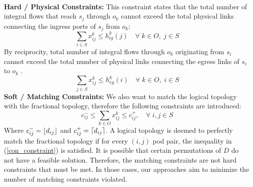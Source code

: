 \documentclass[sigconf]{acmart}
\theoremstyle{definition}
\begin{document}
\textbf{\\Hard / Physical Constraints: } This constraint states that the total number of integral flows that reach $s_j$ through $o_k$ cannot exceed the total physical links connecting the ingress ports of $s_j$ from $o_k$:
\begin{equation}\label{phy_constraint1}
    \sum_{i \in S} x_{ij}^k \leq h_{ig}^k(j) \quad \forall \; k \in O, \; j \in S
\end{equation}
By reciprocity, total number of integral flows through $o_k$ originating from $s_i$ cannot exceed the total number of physical links connecting the egress links of $s_i$ to $o_k$ .
\begin{equation}\label{phy_constraint2}
    \sum_{j \in S} x_{ij}^k \leq h_{eg}^k(i) \quad \forall \; k \in O, \; i \in S
\end{equation}
\textbf{Soft / Matching Constraints: } We also want to match the logical topology with the fractional topology, therefore the following constraints are introduced:
\begin{equation}\label{con_constraint}
    c_{ij}^- \leq \sum_{k \in O} x_{ij}^k \leq c_{ij}^+, \quad \forall \; i,j \in S
\end{equation}
Where $c_{ij}^- = \left\lfloor d_{ij} \right\rfloor$ and $c_{ij}^+ = \left\lceil d_{ij} \right\rceil$. A logical topology is deemed to perfectly match the fractional topology if for every $(i, j)$ pod pair, the inequality in (\ref{con_constraint}) is satisfied. It is possible that certain permutations of $D$ do not have a feasible solution. Therefore, the matching constraints are not hard constraints that must be met. In those cases, our approaches aim to minimize the number of matching constraints violated.\\
\end{document}
